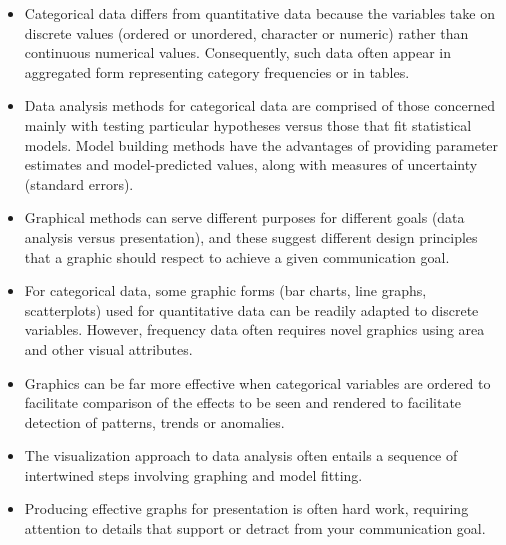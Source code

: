 
\begin{itemize}

  \item Categorical data differs from quantitative data because the variables take on
  discrete values (ordered or unordered, character or numeric)
  rather than continuous numerical values. Consequently,
  such data often appear in aggregated form representing category frequencies or in tables.

  \item Data analysis methods for categorical data are comprised of those concerned mainly
  with testing particular hypotheses versus those that fit statistical models.
  Model building methods have the advantages of providing parameter estimates and
  model-predicted values, along with measures of uncertainty (standard errors).

  \item Graphical methods can serve different purposes for different goals
  (data analysis versus presentation), and these suggest different design
  principles that a graphic should respect to achieve a given communication goal.

  \item For categorical data, some graphic forms (bar charts, line graphs,
  scatterplots) used for quantitative data can be readily adapted to
  discrete variables.
  However, frequency data often requires novel graphics using area and other
  visual attributes.

  \item Graphics can be far more effective when categorical variables are ordered
  to facilitate comparison of the effects to be seen and rendered to facilitate
  detection of patterns, trends or anomalies.

  \item The visualization approach to data analysis often entails a sequence of
  intertwined steps  involving graphing and model fitting.

  \item Producing effective graphs for presentation is often hard work, requiring
  attention to details that support or detract from your communication goal.
\end{itemize}
